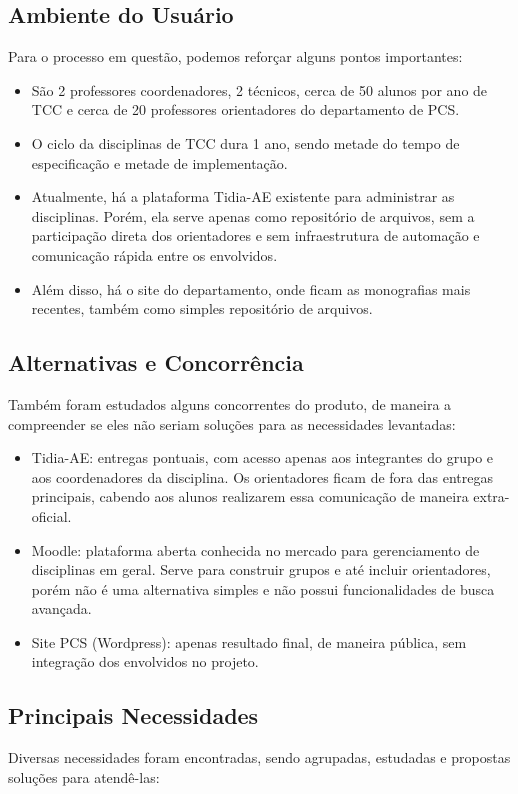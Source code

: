 \subsection{Ambiente do Usuário}
Para o processo em questão, podemos reforçar alguns pontos importantes:

\begin{itemize}
    \item São 2 professores coordenadores, 2 técnicos, cerca de 50 alunos por ano de TCC e cerca de 20 professores orientadores do departamento de PCS.
    \item O ciclo da disciplinas de TCC dura 1 ano, sendo metade do tempo de especificação e metade de implementação.
    \item Atualmente, há a plataforma Tidia-AE existente para administrar as disciplinas. Porém, ela serve apenas como repositório de arquivos, sem a participação direta dos orientadores e sem infraestrutura de automação e comunicação rápida entre os envolvidos.
    \item Além disso, há o site do departamento, onde ficam as monografias mais recentes, também como simples repositório de arquivos.
\end{itemize}

\subsection{Alternativas e Concorrência}
Também foram estudados alguns concorrentes do produto, de maneira a compreender se eles não seriam soluções para as necessidades levantadas:

\begin{itemize}
    \item Tidia-AE: entregas pontuais, com acesso apenas aos integrantes do grupo e aos coordenadores da disciplina. Os orientadores ficam de fora das entregas principais, cabendo aos alunos realizarem essa comunicação de maneira extra-oficial.
    \item Moodle: plataforma aberta conhecida no mercado para gerenciamento de disciplinas em geral. Serve para construir grupos e até incluir orientadores, porém não é uma alternativa simples e não possui funcionalidades de busca avançada.
    \item Site PCS (Wordpress): apenas resultado final, de maneira pública, sem integração dos envolvidos no projeto.
\end{itemize}

\subsection{Principais Necessidades}
Diversas necessidades foram encontradas, sendo agrupadas, estudadas e propostas soluções para atendê-las:

